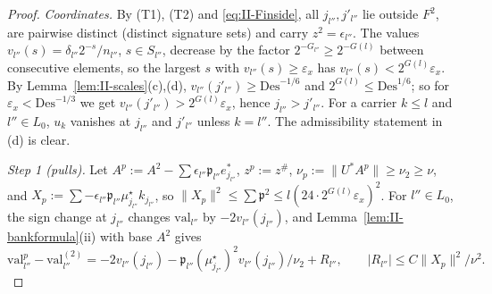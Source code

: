 \documentclass[10pt]{amsart}
\theoremstyle{definition}
\theoremstyle{remark}
\begin{document}
\begin{proof}
\emph{Coordinates.}  By (T1), (T2) and \eqref{eq:II-Finside}, all
$j_{l''},j'_{l''}$ lie outside $F^2$, are pairwise distinct (distinct
signature sets) and carry $z^2=\epsilon_{l''}$.  The values $v_{l''}(s)=
\delta_{l''}2^{-s}/n_{l''}$, $s\in S_{l''}$, decrease by the factor
$2^{-G_{l''}}\ge2^{-G(l)}$ between consecutive elements, so the largest
$s$ with $v_{l''}(s)\ge\varepsilon_x$ has $v_{l''}(s)<2^{G(l)}\varepsilon_x$.
By Lemma~\ref{lem:II-scales}(c),(d), $v_{l''}(j'_{l''})\ge
\mathrm{Des}^{-1/6}$ and $2^{G(l)}\le\mathrm{Des}^{1/6}$; so for
$\varepsilon_x<\mathrm{Des}^{-1/3}$ we get $v_{l''}(j'_{l''})>2^{G(l)}
\varepsilon_x$, hence $j_{l''}>j'_{l''}$.  For a carrier $k\le l$ and
$l''\in L_0$, $u_k$ vanishes at $j_{l''}$ and $j'_{l''}$ unless $k=l''$.
The admissibility statement in (d) is clear.

\emph{Step 1 (pulls).}  Let $A^p:=A^2-\sum\epsilon_{l''}\mathfrak p_{l''}
e^*_{j_{l''}}$, $z^p:=z^\#$, $\nu_p:=\|U^*A^p\|\ge\nu_2\ge\nu$, and
$X_p:=\sum-\epsilon_{l''}\mathfrak p_{l''}\mu^\star_{j_{l''}}k_{j_{l''}}$, so
$\|X_p\|^2\le\sum\mathfrak p^2\le l(24\cdot2^{G(l)}\varepsilon_x)^2$.  For
$l''\in L_0$, the sign change at $j_{l''}$ changes $\mathrm{val}_{l''}$ by
$-2v_{l''}(j_{l''})$, and Lemma~\ref{lem:II-bankformula}(ii) with base
$A^2$ gives
\[
 \mathrm{val}^p_{l''}-\mathrm{val}^{(2)}_{l''}=-2v_{l''}(j_{l''})-
 \mathfrak p_{l''}(\mu^\star_{j_{l''}})^2v_{l''}(j_{l''})/\nu_2+R_{l''},
 \qquad|R_{l''}|\le C\|X_p\|^2/\nu^2 .
\]


\end{proof}
\end{document}
